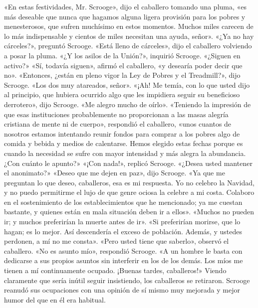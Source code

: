 \documentclass{novela}
\begin{document}
 «En estas festividades, Mr. Scrooge», dijo el caballero tomando una pluma, «es más deseable que nunca que hagamos alguna ligera provisión para los pobres y menesterosos, que sufren muchísimo en estos momentos. Muchos miles carecen de lo más indispensable y cientos de miles necesitan una ayuda, señor».
 «¿Ya no hay cárceles?», preguntó Scrooge.
 «Está lleno de cárceles», dijo el caballero volviendo a posar la pluma.
 «¿Y los asilos de la Unión?», inquirió Scrooge. «¿Siguen en activo?»
 «Sí, todavía siguen», afirmó el caballero, «y desearía poder decir que no».
 «Entonces, ¿están en pleno vigor la Ley de Pobres y el Treadmill?», dijo Scrooge.
 «Los dos muy atareados, señor».
 «¡Ah! Me temía, con lo que usted dijo al principio, que hubiera ocurrido algo que les impidiera seguir su beneficioso derrotero», dijo Scrooge. «Me alegro mucho de oírlo».
 «Teniendo la impresión de que esas instituciones probablemente no proporcionan a las masas alegría cristiana de mente ni de cuerpo», respondió el caballero, «unos cuantos de nosotros estamos intentando reunir fondos para comprar a los pobres algo de comida y bebida y medios de calentarse. Hemos elegido estas fechas porque es cuando la necesidad se sufre con mayor intensidad y más alegra la abundancia. ¿Con cuánto le apunto?»
 «¡Con nada!», replicó Scrooge.
 «¿Desea usted mantener el anonimato?»
 «Deseo que me dejen en paz», dijo Scrooge. «Ya que me preguntan lo que deseo, caballeros, esa es mi respuesta. Yo no celebro la Navidad, y no puedo permitirme el lujo de que genre ociosa la celebre a mi costa. Colaboro en el sostenimiento de los establecimientos que he mencionado; ya me cuestan bastante, y quienes están en mala situación deben ir a ellos».
 «Muchos no pueden ir; y muchos preferirían la muerte antes de ir».
 «Si preferirían morirse, que lo hagan; es lo mejor. Así descendería el exceso de población. Además, y ustedes perdonen, a mí no me consta».
 «Pero usted tiene que saberlo», observó el caballero.
 «No es asunto mío», respondió Scrooge. «A un hombre le basta con dedicarse a sus propios asuntos sin interferir en los de los demás. Los míos me tienen a mí continuamente ocupado. ¡Buenas tardes, caballeros!»
 Viendo claramente que sería inútil seguir insistiendo, los caballeros se retiraron. Scrooge reanudó sus ocupaciones con una opinión de sí mismo muy mejorada y mejor humor del que en él era habitual.
\end{document}
